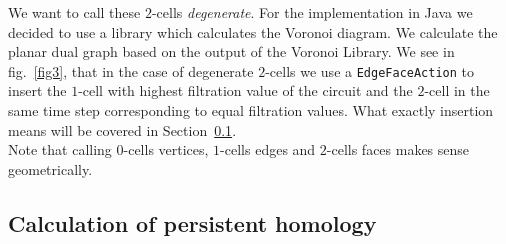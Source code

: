 \documentclass[11pt, a4paper, UKenglish]{article}
\begin{document}
    We want to call these $2$-cells \textit{degenerate}.
    For the implementation in Java we decided to use a library which calculates the Voronoi diagram.
    We calculate the planar dual graph based on the output of the Voronoi Library.
    We see in fig.~\ref{fig3}, that in the case of degenerate $2$-cells we use a \texttt{EdgeFaceAction} to insert the $1$-cell with highest filtration value of the circuit and the $2$-cell in the same time step corresponding to equal filtration values.
    What exactly insertion means will be covered in Section~\ref{subsec:calculation-of-persistent-homology}.\\
    Note that calling $0$-cells vertices, $1$-cells edges and $2$-cells faces makes sense geometrically.

    \subsection{Calculation of persistent homology}\label{subsec:calculation-of-persistent-homology}
\end{document}
